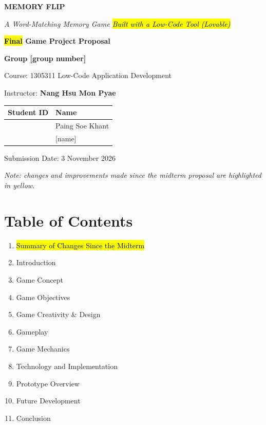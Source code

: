 \documentclass[11pt,a4paper]{article}
\begin{document}
\begin{titlepage}
\centering
\vspace*{5cm}
{\fontsize{36}{42}\selectfont\bfseries\color{navy} MEMORY FLIP\par}
\vspace{0.8cm}
{\Large\itshape A Word-Matching Memory Game \hl{Built with a Low-Code Tool (Lovable)}\par}
\vspace{1cm}
{\Large\bfseries \hl{Final} Game Project Proposal\par}
\vspace{0.5cm}
{\large\bfseries Group [group number]\par}
\vspace{1cm}
Course: 1305311 Low-Code Application Development\par
\vspace{0.2cm}
Instructor: \textbf{Nang Hsu Mon Pyae}\par
\vspace{0.4cm}
\begin{tabular}{|p{5cm}|p{5cm}|}
\hline
\rowcolor{headgray}\textbf{Student ID} & \textbf{Name} \\ \hline
[student ID] & Paing Soe Khant \\ \hline
[student ID] & [name] \\ \hline
\end{tabular}
\par\vspace{0.6cm}
Submission Date: 3 November 2026\par
\vspace{0.6cm}
{\small\itshape Note: changes and improvements made since the midterm proposal are highlighted in yellow.\par}
\vfill
\end{titlepage}

{\color{navy}\section*{Table of Contents}}
\begin{enumerate}
  \item \hl{Summary of Changes Since the Midterm}
  \item Introduction
  \item Game Concept
  \item Game Objectives
  \item Game Creativity \& Design
  \item Gameplay
  \item Game Mechanics
  \item Technology and Implementation
  \item Prototype Overview
  \item Future Development
  \item Conclusion
\end{enumerate}
\newpage
\end{document}
